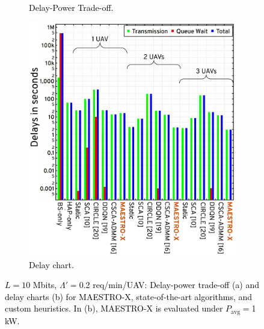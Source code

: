 \documentclass[10pt, twocolumn]{IEEEtran}
\theoremstyle{plain}
\theoremstyle{definition}
\theoremstyle{remark}
\newcommand\hlt[1]{\textcolor{black}{#1}}
\begin{document}
{\begin{figure} [t]
\begin{subfigure}{0.55\linewidth}
         \caption{\hlt{Delay-Power Trade-off.}}
         \label{F8}
     \end{subfigure}
     \hfill
     \begin{subfigure}{0.433\linewidth}
         \centering
         \includegraphics[width=1.0\linewidth]{figs/Delay_Power_10Mb_Chart_Low_Congestion.jpeg}
         \caption{\hlt{Delay chart.}}
         \label{F9}
     \end{subfigure}
     \caption{\hlt{$L{=}10$ Mbits, $\Lambda'{=}$0.2 req/min/UAV: Delay-power trade-off (a) and delay charts (b) for MAESTRO-X, state-of-the-art algorithms, and custom heuristics. In (b), MAESTRO-X is evaluated under $P_{\mathrm{avg}}=$1 kW.}}
     \vspace{-6mm}
     \label{F8F9}
\end{figure}

}
\end{document}
